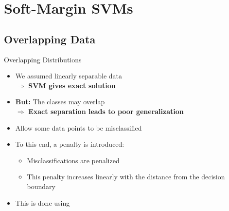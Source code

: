 \section{Soft-Margin SVMs}

\subsection{Overlapping Data}

\begin{frame}{Overlapping Distributions}{}
	\begin{itemize}
		\item We assumed linearly separable data \\
			\hspace*{5mm} $\Rightarrow$ \textbf{SVM gives exact solution}
		\item \textbf{But:} The classes may overlap \\
			\hspace*{5mm} $\Rightarrow$ \textbf{Exact separation leads to poor generalization}
		\item {} Allow some data points to be misclassified
		\item To this end, a penalty is introduced:
		\begin{itemize}
			\item Misclassifications are penalized
			\item This penalty increases linearly with the distance from the decision boundary
		\end{itemize}
		\item This is done using 
	\end{itemize}
\end{frame}


